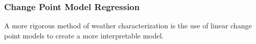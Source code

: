 \subsubsection{Change Point Model Regression}
\label{sec:changepointmodels}

A more rigorous method of weather characterization is the use of linear change point models to create a more interpretable model.